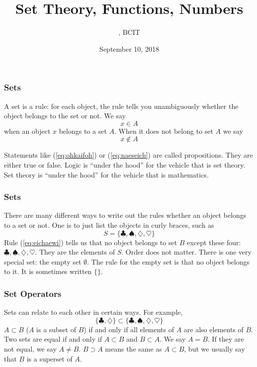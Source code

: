 \documentclass[xcolor=dvipsnames]{beamer}
\title{Set Theory, Functions, Numbers}
\subtitle{{\CourseNumber}, BCIT}
\author{\CourseName}
\date{September 10, 2018}
\begin{document}
\begin{frame}
  \titlepage
\end{frame}

\begin{frame}
  \frametitle{Sets}
  A \alert{set} is a rule: for each object, the rule tells you
  unambiguously whether the object belongs to the set or not. We say
\begin{equation}
  \label{eq:ohkaifoh}
  x\in{}A
\end{equation}
when an object $x$ belongs to a set $A$. When it does not belong to
set $A$ we say
\begin{equation}
  \label{eq:naeseich}
  x\notin{}A
\end{equation}

Statements like (\ref{eq:ohkaifoh}) or (\ref{eq:naeseich}) are called
\alert{propositions}. They are either true or false. Logic is ``under
the hood'' for the vehicle that is set theory. Set theory is ``under
the hood'' for the vehicle that is mathematics.
\end{frame}

\begin{frame}
  \frametitle{Sets}
There are many different ways to write out the rules whether an object
belongs to a set or not. One is to just list the objects in curly
braces, such as
\begin{equation}
  \label{eq:eichaewi}
  S=\{\clubsuit,\spadesuit,\diamondsuit,\heartsuit\}
\end{equation}
Rule (\ref{eq:eichaewi}) tells us that no object belongs to set $B$
except these four: $\clubsuit,\spadesuit,\diamondsuit,\heartsuit$.
They are the \alert{elements} of $S$. Order does not matter. There is
one very special set: the \alert{empty set} $\emptyset$. The rule for
the empty set is that no object belongs to it. It is sometimes written
$\{\}$.
\end{frame}

\begin{frame}
  \frametitle{Set Operators}
  Sets can relate to each other in certain ways. For example,
  \begin{equation}
    \label{eq:johbaexi}
    \{\clubsuit,\diamondsuit\}\subset\{\clubsuit,\spadesuit,\diamondsuit,\heartsuit\}
  \end{equation}
  $A\subset{}B$ ($A$ is a \alert{subset} of $B$) if and only if all
  elements of $A$ are also elements of $B$. Two sets are equal if and
  only if $A\subset{}B$ and $B\subset{}A$. We say $A=B$. If they are
  not equal, we say $A\neq{}B$. $B\supset{}A$ means the same as
  $A\subset{}B$, but we usually say that $B$ is a superset of $A$.
\end{frame}
\end{document}
